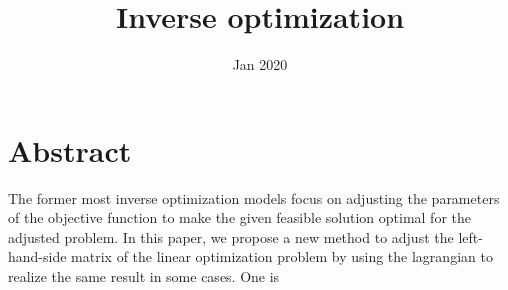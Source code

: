 \documentclass[UTF8]{article}
\title{Inverse optimization}
\date{Jan 2020}
\numberwithin{equation}{section}
\begin{document}
\maketitle{}

\section{Abstract}
The former most inverse optimization models focus on adjusting the parameters of the objective function to make the given feasible solution optimal for the adjusted problem. In this paper, we propose a new method to adjust the left-hand-side matrix of the linear optimization problem by using the lagrangian  to realize the same result in some cases. One is 



%





\end{document}
